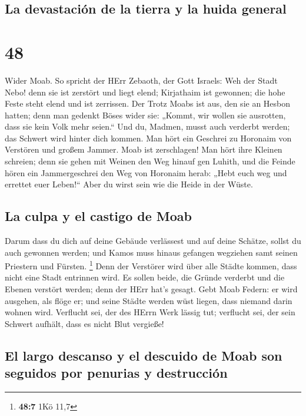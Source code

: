 \hypertarget{la-devastaciuxf3n-de-la-tierra-y-la-huida-general}{%
\subsection{La devastación de la tierra y la huida
general}\label{la-devastaciuxf3n-de-la-tierra-y-la-huida-general}}

\hypertarget{section-47}{%
\section{48}\label{section-47}}

 Wider Moab. So spricht der HErr Zebaoth, der Gott
Israels: Weh der Stadt Nebo! denn sie ist zerstört und liegt elend;
Kirjathaim ist gewonnen; die hohe Feste steht elend und ist zerrissen.
 Der Trotz Moabs ist aus, den sie an Hesbon hatten; denn
man gedenkt Böses wider sie: „Kommt, wir wollen sie ausrotten, dass sie
kein Volk mehr seien.`` Und du, Madmen, musst auch verderbt werden; das
Schwert wird hinter dich kommen.  Man hört ein Geschrei zu
Horonaim von Verstören und großem Jammer.  Moab ist
zerschlagen! Man hört ihre Kleinen schreien;  denn sie
gehen mit Weinen den Weg hinauf gen Luhith, und die Feinde hören ein
Jammergeschrei den Weg von Horonaim herab:  „Hebt euch weg
und errettet euer Leben!{}`` Aber du wirst sein wie die Heide in der
Wüste.

\hypertarget{la-culpa-y-el-castigo-de-moab}{%
\subsection{La culpa y el castigo de
Moab}\label{la-culpa-y-el-castigo-de-moab}}

 Darum dass du dich auf deine Gebäude verlässest und auf
deine Schätze, sollst du auch gewonnen werden; und Kamos muss hinaus
gefangen wegziehen samt seinen Priestern und Fürsten. \footnote{\textbf{48:7}
  1Kö 11,7}  Denn der Verstörer wird über alle Städte
kommen, dass nicht eine Stadt entrinnen wird. Es sollen beide, die
Gründe verderbt und die Ebenen verstört werden; denn der HErr hat's
gesagt.  Gebt Moab Federn: er wird ausgehen, als flöge er;
und seine Städte werden wüst liegen, dass niemand darin wohnen wird.
 Verflucht sei, der des HErrn Werk lässig tut; verflucht
sei, der sein Schwert aufhält, dass es nicht Blut vergieße!

\hypertarget{el-largo-descanso-y-el-descuido-de-moab-son-seguidos-por-penurias-y-destrucciuxf3n}{%
\subsection{El largo descanso y el descuido de Moab son seguidos por
penurias y
destrucción}\label{el-largo-descanso-y-el-descuido-de-moab-son-seguidos-por-penurias-y-destrucciuxf3n}}

